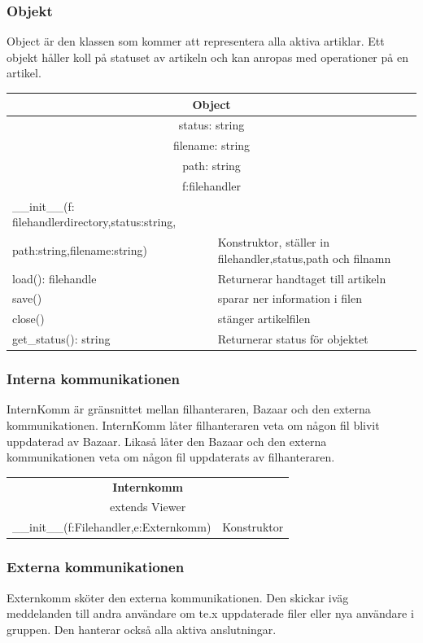 \subsubsection{Objekt}
Object är den klassen som kommer att representera alla aktiva artiklar. Ett objekt håller koll på statuset av artikeln och kan anropas med operationer på en artikel.

\begin{tabular}{|l|p{10 cm}|}
\hline
\multicolumn{2}{|c|}{\textbf{Object}} \\
\hline
\multicolumn{2}{|c|}{status: string} \\
\multicolumn{2}{|c|}{filename: string} \\
\multicolumn{2}{|c|}{path: string} \\
\multicolumn{2}{|c|}{f:filehandler} \\
\hline
\_\_init\_\_(f: filehandlerdirectory,status:string, &\\
path:string,filename:string) &Konstruktor, ställer in filehandler,status,path och filnamn\\
load(): filehandle & Returnerar handtaget till artikeln \\
save() & sparar ner information i filen \\
close() & stänger artikelfilen\\
get\_status(): string & Returnerar status för objektet \\
\hline
\end{tabular}

\subsubsection{Interna kommunikationen}
InternKomm är gränsnittet mellan filhanteraren, Bazaar och den externa kommunikationen. InternKomm låter filhanteraren veta om någon fil blivit uppdaterad av Bazaar. Likaså låter den Bazaar och den externa kommunikationen veta om någon fil uppdaterats av filhanteraren.

\begin{tabular}{|l|p{10 cm}|}
\hline
\multicolumn{2}{|c|}{\textbf{Internkomm}} \\
\multicolumn{2}{|c|}{extends Viewer} \\
\hline
\hline
\_\_init\_\_(f:Filehandler,e:Externkomm) &Konstruktor\\
\hline

\end{tabular}

\subsubsection{Externa kommunikationen}
Externkomm sköter den externa kommunikationen. Den skickar iväg meddelanden till andra användare om te.x uppdaterade filer eller nya användare i gruppen. Den hanterar också alla aktiva anslutningar.

